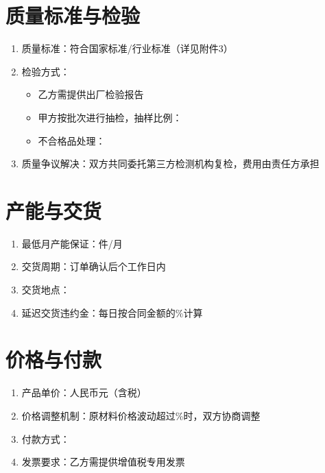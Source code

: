 \documentclass[UTF8]{ctexart}
\begin{document}
\section{质量标准与检验}
\begin{enumerate}
    \item 质量标准：符合\underline{\hspace{3cm}}国家标准/行业标准（详见附件3）
    \item 检验方式：
    \begin{itemize}
        \item 乙方需提供出厂检验报告
        \item 甲方按批次进行抽检，抽样比例：\underline{\hspace{3cm}}
        \item 不合格品处理：\underline{\hspace{6cm}}
    \end{itemize}
    \item 质量争议解决：双方共同委托第三方检测机构复检，费用由责任方承担
\end{enumerate}

\section{产能与交货}
\begin{enumerate}
    \item 最低月产能保证：\underline{\hspace{3cm}}件/月
    \item 交货周期：订单确认后\underline{\hspace{2cm}}个工作日内
    \item 交货地点：\underline{\hspace{6cm}}
    \item 延迟交货违约金：每日按合同金额的\underline{\hspace{1cm}}\%计算
\end{enumerate}

\section{价格与付款}
\begin{enumerate}
    \item 产品单价：人民币\underline{\hspace{2cm}}元（含税）
    \item 价格调整机制：原材料价格波动超过\underline{\hspace{1cm}}\%时，双方协商调整
    \item 付款方式：\underline{\hspace{6cm}}
    \item 发票要求：乙方需提供增值税专用发票
\end{enumerate}
\end{document}
